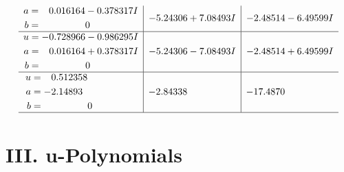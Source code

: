 \documentclass[1p]{elsarticle_modified}
\theoremstyle{definition}
\begin{document}
$$\begin{array}{c|c|c}
\begin{aligned}
a &= \phantom{-}0.016164 - 0.378317 I \\
b &= \phantom{-0.000000 } 0\end{aligned}
 & -5.24306 + 7.08493 I & -2.48514 - 6.49599 I \\ \hline\begin{aligned}
u &= -0.728966 - 0.986295 I \\
a &= \phantom{-}0.016164 + 0.378317 I \\
b &= \phantom{-0.000000 } 0\end{aligned}
 & -5.24306 - 7.08493 I & -2.48514 + 6.49599 I \\ \hline\begin{aligned}
u &= \phantom{-}0.512358\phantom{ +0.000000I} \\
a &= -2.14893\phantom{ +0.000000I} \\
b &= \phantom{-0.000000 } 0\end{aligned}
 & -2.84338\phantom{ +0.000000I} & -17.4870\phantom{ +0.000000I}\\
 \hline 
 \end{array}$$\newpage
\newpage\renewcommand{\arraystretch}{1}
\centering \section*{ III. u-Polynomials}
\end{document}
